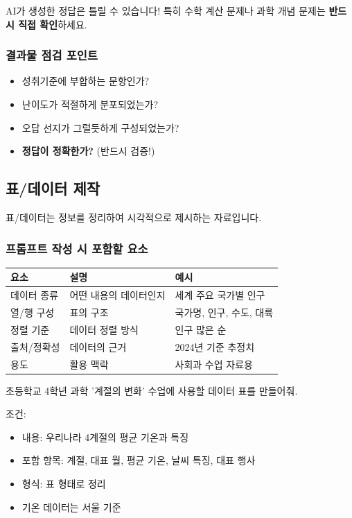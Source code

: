 \documentclass[11pt,a4paper]{article}
\begin{document}
\begin{warningbox}
AI가 생성한 정답은 틀릴 수 있습니다! 특히 수학 계산 문제나 과학 개념 문제는 \textbf{반드시 직접 확인}하세요.
\end{warningbox}

\subsubsection{결과물 점검 포인트}

\begin{itemize}
  \item 성취기준에 부합하는 문항인가?
  \item 난이도가 적절하게 분포되었는가?
  \item 오답 선지가 그럴듯하게 구성되었는가?
  \item \textbf{정답이 정확한가?} (반드시 검증!)
\end{itemize}

\newpage

\subsection{표/데이터 제작}

표/데이터는 정보를 정리하여 시각적으로 제시하는 자료입니다.

\subsubsection{프롬프트 작성 시 포함할 요소}

\begin{center}
\begin{tabular}{|l|l|l|}
\hline
\rowcolor{lightblue}
\textbf{요소} & \textbf{설명} & \textbf{예시} \\
\hline
데이터 종류 & 어떤 내용의 데이터인지 & 세계 주요 국가별 인구 \\
\hline
열/행 구성 & 표의 구조 & 국가명, 인구, 수도, 대륙 \\
\hline
정렬 기준 & 데이터 정렬 방식 & 인구 많은 순 \\
\hline
출처/정확성 & 데이터의 근거 & 2024년 기준 추정치 \\
\hline
용도 & 활용 맥락 & 사회과 수업 자료용 \\
\hline
\end{tabular}
\end{center}

\begin{examplebox}
초등학교 4학년 과학 '계절의 변화' 수업에 사용할 데이터 표를 만들어줘.

조건:
\begin{itemize}[noitemsep]
  \item 내용: 우리나라 4계절의 평균 기온과 특징
  \item 포함 항목: 계절, 대표 월, 평균 기온, 날씨 특징, 대표 행사
  \item 형식: 표 형태로 정리
  \item 기온 데이터는 서울 기준
\end{itemize}
\end{examplebox}
\end{document}
